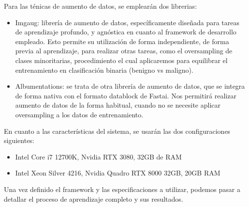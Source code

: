 Para las ténicas de aumento de datos, se emplearán dos librerias:
\begin{itemize}
	\item Imgaug: librería de aumento de datos, específicamente diseñada para tareas de aprendizaje profundo, y agnóstica en cuanto al framework de desarrollo empleado. Esto permite su utilización de forma independiente, de forma previa al aprendizaje, para realizar otras tareas, como el oversampling de clases minoritarias, procedimiento el cual aplicaremos para equilibrar el entrenamiento en clasificación binaria (benigno vs maligno).
	
	 \item Albumentations: se trata de otra librería de aumento de datos, que se integra de forma nativa con el formato datablock de Fastai. Nos permitirá realizar aumento de datos de la forma habitual, cuando no se necesite aplicar oversampling a los datos de entrenamiento.
\end{itemize}

En cuanto a las características del sistema, se usarán las dos configuraciones siguientes:

\begin{itemize}
	\item Intel Core i7 12700K, Nvidia RTX 3080, 32GB de RAM
	\item Intel Xeon Silver 4216, Nvidia Quadro RTX 8000 32GB, 20GB RAM
\end{itemize}

Una vez definido el framework y las especificaciones a utilizar, podemos pasar a detallar el proceso de aprendizaje completo y sus resultados.


